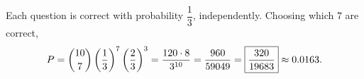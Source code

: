 Each question is correct with probability $\dfrac{1}{3}$, independently. Choosing which $7$ are correct,
\[
P=\dbinom{10}{7}\left(\dfrac{1}{3}\right)^7\left(\dfrac{2}{3}\right)^3=\dfrac{120\cdot8}{3^{10}}=\dfrac{960}{59049}=\boxed{\dfrac{320}{19683}}\approx0.0163 .
\]
